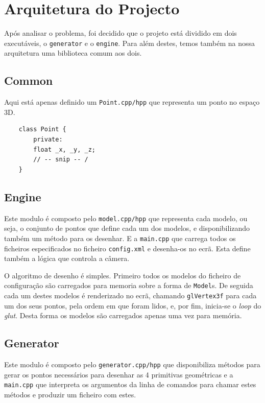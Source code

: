 \documentclass[a4paper]{article}
\begin{document}
\section{Arquitetura do Projecto}
Após analisar o problema, foi decidido que o projeto está dividido em dois executáveis, o \texttt{generator} e o \texttt{engine}. Para além destes, temos também na nossa arquitetura uma biblioteca comum aos dois.

\subsection{Common}

Aqui está apenas definido um \texttt{Point.cpp/hpp} que representa um ponto no espaço 3D.

\begin{verbatim}
    class Point {
        private:
        float _x, _y, _z;
        // -- snip -- /
    }
\end{verbatim}

\subsection{Engine}

Este modulo é composto pelo \texttt{model.cpp/hpp} que representa cada modelo, ou seja, o conjunto de pontos que define cada um dos modelos, e disponibilizando também um método para os desenhar. E a \texttt{main.cpp} que carrega todos os ficheiros especificados no ficheiro \texttt{config.xml} e desenha-os no ecrã. Esta define também a lógica que controla a câmera.

O algoritmo de desenho é simples. Primeiro todos os modelos do ficheiro de configuração são carregados para memoria sobre a forma de \texttt{Model}s. De seguida cada um destes modelos é renderizado no ecrã, chamando \texttt{glVertex3f} para cada um dos seus pontos, pela ordem em que foram lidos, e, por fim, inicia-se o \textit{loop} do \textit{glut}. Desta forma os modelos são carregados apenas uma vez para memória.

\subsection{Generator}

Este modulo é composto pelo \texttt{generator.cpp/hpp} que disponibiliza métodos para gerar os pontos necessários para desenhar as 4 primitivas geométricas e a \texttt{main.cpp} que interpreta os argumentos da linha de comandos para chamar estes métodos e produzir um ficheiro com estes.
\end{document}
